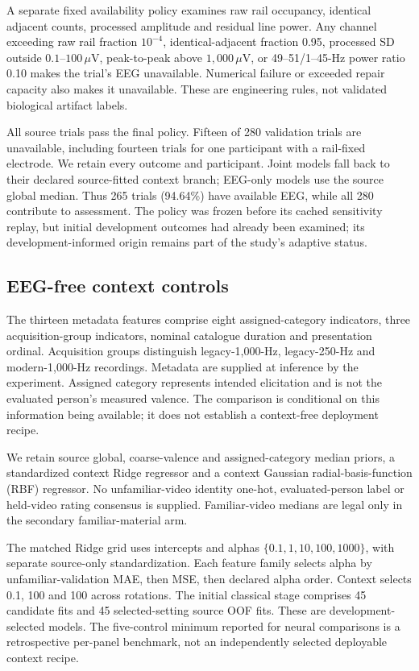 \documentclass[conference]{IEEEtran}
\begin{document}
A separate fixed availability policy examines raw rail occupancy, identical adjacent counts, processed amplitude and residual line power. Any channel exceeding raw rail fraction \(10^{-4}\), identical-adjacent fraction 0.95, processed SD outside \(0.1\)--\(100\,\mu\mathrm{V}\), peak-to-peak above \(1{,}000\,\mu\mathrm{V}\), or 49--51/1--45-Hz power ratio 0.10 makes the trial's EEG unavailable. Numerical failure or exceeded repair capacity also makes it unavailable. These are engineering rules, not validated biological artifact labels.

All source trials pass the final policy. Fifteen of 280 validation trials are unavailable, including fourteen trials for one participant with a rail-fixed electrode. We retain every outcome and participant. Joint models fall back to their declared source-fitted context branch; EEG-only models use the source global median. Thus 265 trials (94.64\%) have available EEG, while all 280 contribute to assessment. The policy was frozen before its cached sensitivity replay, but initial development outcomes had already been examined; its development-informed origin remains part of the study's adaptive status.

\subsection{EEG-free context controls}
The thirteen metadata features comprise eight assigned-category indicators, three acquisition-group indicators, nominal catalogue duration and presentation ordinal. Acquisition groups distinguish legacy-1,000-Hz, legacy-250-Hz and modern-1,000-Hz recordings. Metadata are supplied at inference by the experiment. Assigned category represents intended elicitation and is not the evaluated person's measured valence. The comparison is conditional on this information being available; it does not establish a context-free deployment recipe.

We retain source global, coarse-valence and assigned-category median priors, a standardized context Ridge regressor and a context Gaussian radial-basis-function (RBF) regressor. No unfamiliar-video identity one-hot, evaluated-person label or held-video rating consensus is supplied. Familiar-video medians are legal only in the secondary familiar-material arm.

The matched Ridge grid uses intercepts and alphas \(\{0.1,1,10,100,1000\}\), with separate source-only standardization. Each feature family selects alpha by unfamiliar-validation MAE, then MSE, then declared alpha order. Context selects 0.1, 100 and 100 across rotations. The initial classical stage comprises 45 candidate fits and 45 selected-setting source OOF fits. These are development-selected models. The five-control minimum reported for neural comparisons is a retrospective per-panel benchmark, not an independently selected deployable context recipe.
\end{document}
